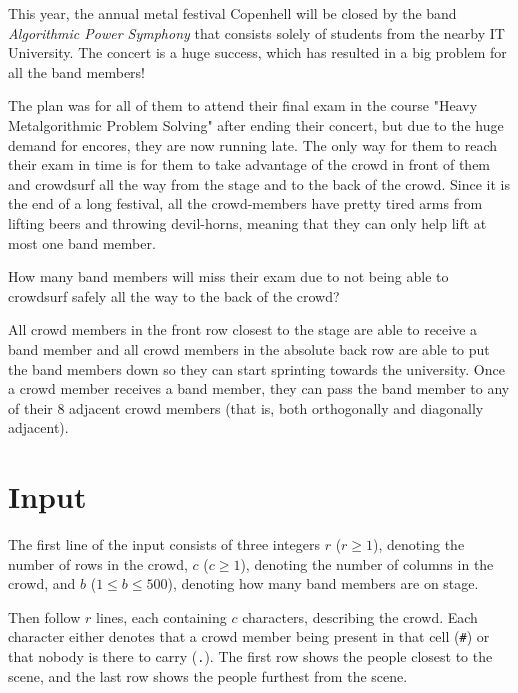 

This year, the annual metal festival Copenhell will be closed by the band \textit{Algorithmic Power Symphony} that consists solely of students from the nearby IT University. The concert is a huge success, which has resulted in a big problem for all the band members!

The plan was for all of them to attend their final exam in the course "Heavy Metalgorithmic Problem Solving" after ending their concert, but due to the huge demand for encores, they are now running late. The only way for them to reach their exam in time is for them to take advantage of the crowd in front of them and crowdsurf all the way from the stage and to the back of the crowd. Since it is the end of a long festival, all the crowd-members have pretty tired arms from lifting beers and throwing devil-horns, meaning that they can only help lift at most one band member.

How many band members will miss their exam due to not being able to crowdsurf safely all the way to the back of the crowd?

All crowd members in the front row closest to the stage are able to receive a band member and all crowd members in the absolute back row are able to put the band members down so they can start sprinting towards the university.
Once a crowd member receives a band member, they can pass the band member to any of their 8 adjacent crowd members (that is, both orthogonally and diagonally adjacent).

\section*{Input}

The first line of the input consists of three integers $r$ ($r \geq 1$), denoting the number of rows in the crowd, $c$ ($c \geq 1$), denoting the number of columns in the crowd, and $b$ ($1 \leq b \leq 500$), denoting how many band members are on stage.

Then follow $r$ lines, each containing $c$ characters, describing the crowd. Each character either denotes that a crowd member being present in that cell (\texttt{\#}) or that nobody is there to carry (\texttt{.}). The first row shows the people closest to the scene, and the last row shows the people furthest from the scene.

